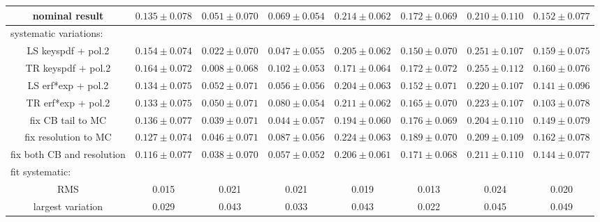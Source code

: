 \begin{table}
\begin{tabular}{c|ccccccc}
nominal result             & $0.135\pm0.078$ & $0.051\pm0.070$ & $0.069\pm0.054$ & $0.214\pm0.062$ & $0.172\pm0.069$ & $0.210\pm0.110$ & $0.152\pm0.077$ \\
\hline
 \multicolumn{8}{l}{systematic variations:} \\
LS keyspdf + pol.2         & $0.154\pm0.074$ & $0.022\pm0.070$ & $0.047\pm0.055$ & $0.205\pm0.062$ & $0.150\pm0.070$ & $0.251\pm0.107$ & $0.159\pm0.075$ \\
TR keyspdf + pol.2         & $0.164\pm0.072$ & $0.008\pm0.068$ & $0.102\pm0.053$ & $0.171\pm0.064$ & $0.172\pm0.072$ & $0.255\pm0.112$ & $0.160\pm0.076$ \\
LS erf*exp + pol.2         & $0.134\pm0.075$ & $0.052\pm0.071$ & $0.056\pm0.056$ & $0.204\pm0.063$ & $0.152\pm0.071$ & $0.220\pm0.107$ & $0.141\pm0.096$ \\
TR erf*exp + pol.2         & $0.133\pm0.075$ & $0.050\pm0.071$ & $0.080\pm0.054$ & $0.211\pm0.062$ & $0.165\pm0.070$ & $0.223\pm0.107$ & $0.103\pm0.078$ \\
fix CB tail to MC          & $0.136\pm0.077$ & $0.039\pm0.071$ & $0.044\pm0.057$ & $0.194\pm0.060$ & $0.176\pm0.069$ & $0.204\pm0.110$ & $0.149\pm0.079$ \\
fix resolution to MC       & $0.127\pm0.074$ & $0.046\pm0.071$ & $0.087\pm0.056$ & $0.224\pm0.063$ & $0.189\pm0.070$ & $0.209\pm0.109$ & $0.162\pm0.078$ \\
fix both CB and resolution & $0.116\pm0.077$ & $0.038\pm0.070$ & $0.057\pm0.052$ & $0.206\pm0.061$ & $0.171\pm0.068$ & $0.211\pm0.110$ & $0.144\pm0.077$ \\
\hline
 \multicolumn{8}{l}{fit systematic:} \\
RMS                        & 0.015 & 0.021 & 0.021 & 0.019 & 0.013 & 0.024 & 0.020 \\
largest variation          & 0.029 & 0.043 & 0.033 & 0.043 & 0.022 & 0.045 & 0.049 \\
\hline
  \end{tabular}
  \label{tab:final_singlerat_centrality}
\end{table}

